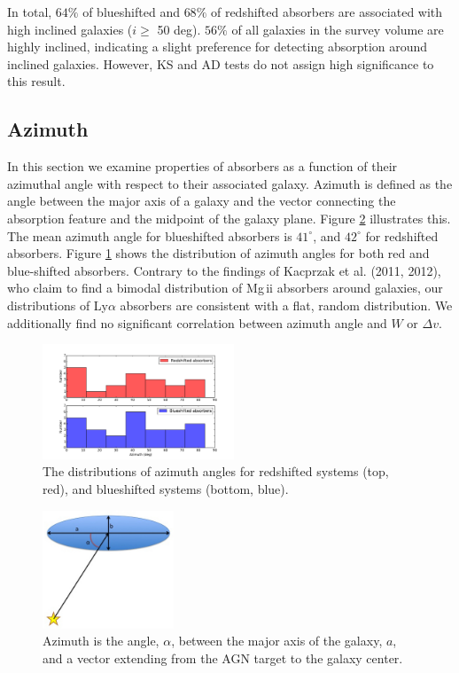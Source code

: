 \documentclass[iop]{emulateapj-rtx4}
\begin{document}
In total, $64\%$ of blueshifted and $68\%$ of redshifted absorbers are associated with high inclined galaxies ($i \geq$ 50 deg). $56\%$ of all galaxies in the survey volume are highly inclined, indicating a slight preference for detecting absorption around inclined galaxies. However, KS and AD tests do not assign high significance to this result. 

\subsection{Azimuth}
In this section we examine properties of absorbers as a function of their azimuthal angle with respect to their associated galaxy. Azimuth is defined as the angle between the major axis of a galaxy and the vector connecting the absorption feature and the midpoint of the galaxy plane. Figure \ref{azimuth_illustration} illustrates this. The mean azimuth angle for blueshifted absorbers is $41^{\circ}$, and $42^{\circ}$ for redshifted absorbers. Figure \ref{azimuth_dist} shows the distribution of azimuth angles for both red and blue-shifted absorbers. Contrary to the findings of Kacprzak et al. (2011, 2012), who claim to find a bimodal distribution of Mg\,{\sc ii} absorbers around galaxies, our distributions of Ly$\alpha$ absorbers are consistent with a flat, random distribution. We additionally find no significant correlation between azimuth angle and $W$ or $\Delta v$. 

\begin{figure}[h!]
        \centering
        \includegraphics[width=0.51\textwidth]{hist(azimuth)_dif.pdf}
        \caption{\small{The distributions of azimuth angles for redshifted systems (top, red), and blueshifted systems (bottom, blue).}}
        \label{azimuth_dist}
\end{figure} 

\begin{figure}[h!]
        \centering
        \includegraphics[width=0.35\textwidth]{azimuth_illustration_cut.jpg}
        \caption{\small{Azimuth is the angle, $\alpha$, between the major axis of the galaxy, $a$, and a vector extending from the AGN target to the galaxy center.}}
        \label{azimuth_illustration}
\end{figure} 
\end{document}
